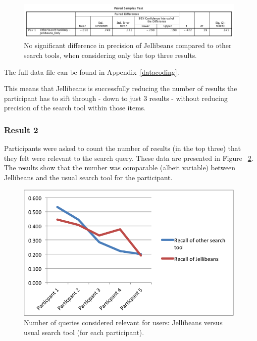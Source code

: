 \documentclass[a4paper, 11pt]{article}
\begin{document}
\begin{figure}[H]
\begin{center}
\includegraphics[scale=0.47]{Result1spss}
\caption{No significant difference in precision of Jellibeans compared to other search tools, when considering only the top three results.}
\label{result1spss}
\end{center}
\end{figure}

The full data file can be found in Appendix~\ref{datacoding}.

\vspace{5mm}
This means that Jellibeans is successfully reducing the number of results the participant has to sift through - down to just 3 results - without reducing precision of the search tool within those items.

\subsubsection{Result 2}
Participants were asked to count the number of results (in the top three) that they felt were relevant to the search query. These data are presented in Figure ~\ref{result2}. The results show that the number was comparable (albeit variable) between Jellibeans and the usual search tool for the participant.

\begin{figure}[H]
\begin{center}
\includegraphics[scale=1]{result2}
\caption{Number of queries considered relevant for users: Jellibeans versus usual search tool (for each participant).}
\label{result2}
\end{center}
\end{figure}
\end{document}
